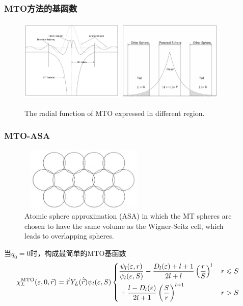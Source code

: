 \documentclass[cjk,slidestop,compress,mathserif,blue]{beamer}
\begin{document}
\frame
{
	\frametitle{\textrm{MTO}方法的基函数}
\begin{figure}[h!]
\centering
\includegraphics[height=1.55in,width=1.95in,viewport=0 0 845 635,clip]{Figures/MTO-envelope-1.png}
\includegraphics[height=1.55in,width=1.95in,viewport=0 0 885 635,clip]{Figures/MTO-envelope-2.png}
\caption{\tiny \textrm{The radial function of MTO expressed in different region.}}%
\label{MTO-envelope}
\end{figure}
}

\frame
{
	\frametitle{\textrm{MTO-ASA}}
\begin{figure}[h!]
	\vspace{-15pt}
\centering
\includegraphics[height=1.20in,width=2.42in,viewport=5 0 1005 495,clip]{Figures/Atomic_sphere-appro.png}
\caption{\fontsize{8.2pt}{5.2pt}\selectfont\textrm{Atomic sphere approximation (ASA) in which the MT spheres are chosen to have the same volume as the Wigner-Seitz cell, which leads to overlapping spheres.}}

\label{Atomic_sphere-appro}
\end{figure}
当$q_0=0$时，构成最简单的\textrm{MTO}基函数
		\begin{displaymath}
			\hspace*{-12pt}\chi_L^{\mathrm{MTO}}(\varepsilon,0,\vec r)=\mathrm{i}^lY_L(\hat{\vec r})\psi_l(\varepsilon,S)\left\{
			\begin{aligned}
				&\dfrac{\psi_l(\varepsilon,r)}{\psi_l(\varepsilon,S)}-\dfrac{D_l(\varepsilon)+l+1}{2l+l}\left(\dfrac rS\right)^l&\, r\leqslant S\\
				&+\dfrac{l-D_l(\varepsilon)}{2l+1}\left(\dfrac Sr\right)^{l+1}&\, r>S
			\end{aligned}\right.
		\end{displaymath}
}
\end{document}

